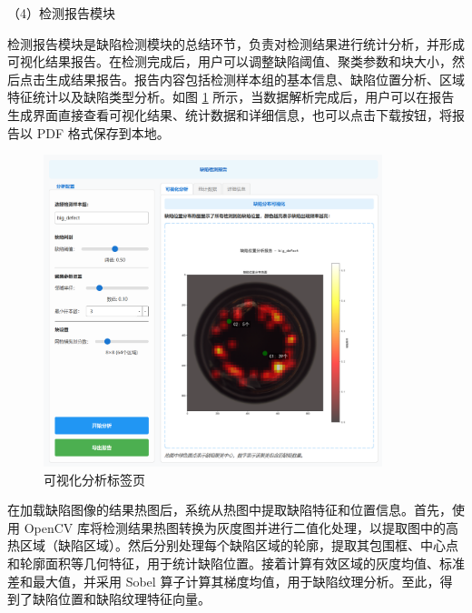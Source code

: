 \documentclass[
  ]{njuthesis}
\begin{document}
（4）检测报告模块

检测报告模块是缺陷检测模块的总结环节，负责对检测结果进行统计分析，并形成可视化结果报告。在检测完成后，用户可以调整缺陷阈值、聚类参数和块大小，然后点击生成结果报告。报告内容包括检测样本组的基本信息、缺陷位置分析、区域特征统计以及缺陷类型分析。如图 \ref{可视化分析标签页} 所示，当数据解析完成后，用户可以在报告生成界面直接查看可视化结果、统计数据和详细信息，也可以点击下载按钮，将报告以 PDF 格式保存到本地。

\begin{figure}[htb]
    \centering
    \includegraphics[width=0.88\textwidth]{images/可视化分析标签页.png}
    \caption{可视化分析标签页}
    \label{可视化分析标签页}
\end{figure}


在加载缺陷图像的结果热图后，系统从热图中提取缺陷特征和位置信息。首先，使用 OpenCV 库将检测结果热图转换为灰度图并进行二值化处理，以提取图中的高热区域（缺陷区域）。然后分别处理每个缺陷区域的轮廓，提取其包围框、中心点和轮廓面积等几何特征，用于统计缺陷位置。接着计算有效区域的灰度均值、标准差和最大值，并采用 Sobel 算子计算其梯度均值，用于缺陷纹理分析。至此，得到了缺陷位置和缺陷纹理特征向量。
\end{document}
